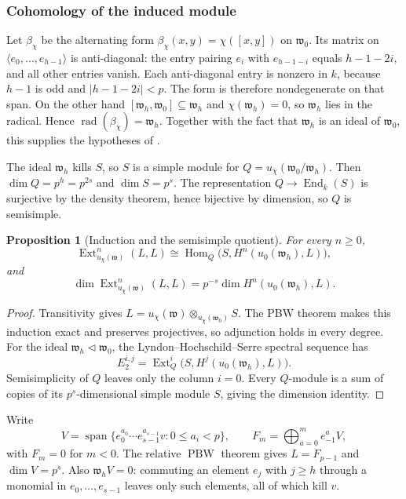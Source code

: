 \documentclass[11pt,reqno]{amsart}
\newtheorem{proposition}[proposition]{Proposition}
\theoremstyle{definition}
\theoremstyle{remark}
\theoremstyle{definition}
\newcommand{\Hom}{\operatorname{Hom}}
\newcommand{\Ext}{\operatorname{Ext}}
\begin{document}
\subsubsection{Cohomology of the induced module}

Let $\beta_\chi$ be the alternating form $\beta_\chi(x,y)=\chi([x,y])$
on $\mathfrak{w}_0$. Its matrix on
$\langle e_0,\ldots,e_{h-1}\rangle$ is anti-diagonal: the entry pairing
$e_i$ with $e_{h-1-i}$ equals $h-1-2i$, and all other entries vanish.
Each anti-diagonal entry is nonzero in $k$, because $h-1$ is odd and
$|h-1-2i|<p$. The form is therefore nondegenerate on that span. On the
other hand $[\mathfrak{w}_h,\mathfrak{w}_0]\subseteq\mathfrak{w}_h$ and $\chi(\mathfrak{w}_h)=0$, so
$\mathfrak{w}_h$ lies in the radical. Hence
$\operatorname{rad}(\beta_\chi)=\mathfrak{w}_h$. Together with the fact that
$\mathfrak{w}_h$ is an ideal of $\mathfrak{w}_0$, this supplies the hypotheses of
\cite[Theorem 4.3(C)]{BoeNakanoWiesner2009}.

The ideal $\mathfrak{w}_h$ kills $S$, so $S$ is a simple module for
$Q=u_{\bar\chi}(\mathfrak{w}_0/\mathfrak{w}_h)$. Then $\dim Q=p^h=p^{2s}$ and
$\dim S=p^s$. The representation $Q\to\operatorname{End}_k(S)$ is
surjective by the density theorem, hence bijective by dimension, so $Q$
is semisimple. \begin{proposition}[Induction and the semisimple quotient]
\label{bnw:prop:adjunction}
For every $n\ge0$,
\[
 \Ext^n_{u_\chi(\mathfrak w)}(L,L)
 \cong\Hom_Q\bigl(S,H^n(u_0(\mathfrak w_h),L)\bigr),
\]
and
\begin{equation}\label{bnw:eq:BNW}
 \dim\Ext^n_{u_\chi(\mathfrak w)}(L,L)
 =p^{-s}\dim H^n(u_0(\mathfrak w_h),L).
\end{equation}
\end{proposition}

\begin{proof}
Transitivity gives
$L=u_\chi(\mathfrak w)\otimes_{u_\chi(\mathfrak w_0)}S$.
The PBW theorem makes this induction exact and preserves projectives,
so adjunction holds in every degree.
For the ideal $\mathfrak w_h\triangleleft\mathfrak w_0$, the
Lyndon--Hochschild--Serre spectral sequence has
\[
 E_2^{i,j}=\Ext_Q^i\bigl(S,H^j(u_0(\mathfrak w_h),L)\bigr).
\]
Semisimplicity of $Q$ leaves only the column $i=0$.
Every $Q$-module is a sum of copies of its $p^s$-dimensional simple
module $S$, giving the dimension identity.
\end{proof}

Write
\[
V=\operatorname{span}\{e_0^{a_0}\cdots e_{s-1}^{a_{s-1}}v:0\le a_i<p\},
\qquad F_m=\bigoplus_{a=0}^{m}e_{-1}^aV,
\]
with $F_m=0$ for $m<0$. The relative $\operatorname{PBW}$ theorem gives $L=F_{p-1}$
and $\dim V=p^s$. Also $\mathfrak{w}_hV=0$: commuting an element $e_j$ with $j\ge h$ through a
monomial in $e_0,\ldots,e_{s-1}$ leaves only such elements, all of
which kill $v$.
\end{document}
